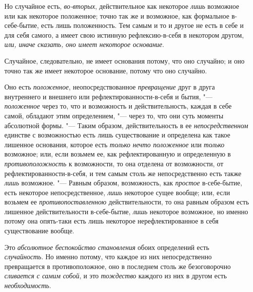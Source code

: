 Но случайное есть, {\em во-вторых}, действительное как
некоторое {\em лишь} возможное или как некоторое
положенное; точно так же и возможное, как формальное в-себе-бытие, есть
лишь положенность. Тем самым и то и другое не есть в себе и для себя
самого, а имеет свою истинную рефлексию-в-себя в некотором другом,
{\em или, иначе сказать, оно имеет некоторое основание}.

Случайное, следовательно, не имеет основания потому, что оно случайно; и оно
точно так же имеет некоторое основание, потому что оно случайно.

Оно есть {\em положенное}, неопосредствованное
{\em превращение} друг в друга внутреннего и внешнего
или рефлектированности-в-себя и бытия, "---
{\em положенное} через то, что и возможность и
действительность, каждая в себе самой, обладают этим определением, "--- через
то, что они суть моменты абсолютной формы. "--- Таким образом,
действительность в ее {\em непосредственном} единстве с
возможностью есть лишь существование и определена как такое лишенное
основания, которое есть {\em только нечто положенное}
или {\em только} возможное; или, если возьмем ее, как
рефлектированную и определенную в
{\em противоположность} к возможности, то она отделена
от возможности, от рефлектированности-в-себя, и тем самым столь же
непосредственно есть также {\em лишь} возможное. "---
Равным образом, возможность, как {\em простое}
в-себе-бытие, есть некоторое непосредственное,
{\em лишь} некоторое сущее вообще; или, если возьмем ее
{\em противопоставленною} действительности, то она
равным образом есть лишенное действительности в-себе-бытие,
{\em лишь} некоторое возможное, но именно потому она
опять-таки есть лишь некоторое нерефлектированное в себя существование вообще.

Это {\em абсолютное беспокойство становления} обоих
определений есть {\em случайность}. Но именно потому,
что каждое из них непосредственно превращается в противоположное, оно в
последнем столь же безоговорочно {\em сливается с самим
собой}, и это {\em тождество} каждого из них в другом есть {\em необходимость}.

